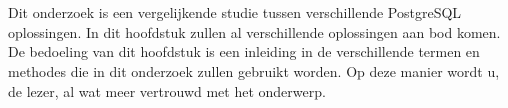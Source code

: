 \chapter{}
\label{ch:stand-van-zaken}

Dit onderzoek is een vergelijkende studie tussen verschillende PostgreSQL oplossingen. In dit hoofdstuk zullen al verschillende oplossingen aan bod komen. De bedoeling van dit hoofdstuk is een inleiding in de verschillende termen en methodes die in dit onderzoek zullen gebruikt worden. Op deze manier wordt u, de lezer, al wat meer vertrouwd met het onderwerp.




